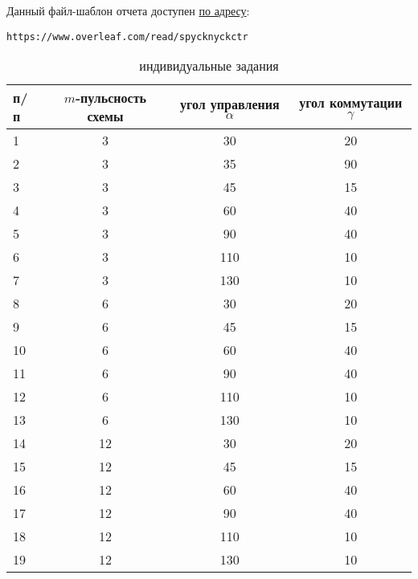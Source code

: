 Данный файл-шаблон отчета доступен \href{https://www.overleaf.com/read/spycknyckctr}{по адресу}:
\begin{verbatim}
https://www.overleaf.com/read/spycknyckctr
\end{verbatim}

\begin{table}[ht!]
\centering
\begin{tabular}{l|c|c|c}
\toprule
	\textnumero п/п&	$m$-пульсность схемы & угол управления $\alpha$ & угол коммутации $\gamma$ \\
\midrule
	1&	3 & 30 & 20\\ 
	2&	3 & 35 & 90\\ 
	3&	3 & 45 & 15\\ 
	4&	3 & 60 & 40\\ 
	5&	3 & 90 & 40\\ 
	6&	3 & 110 & 10\\ 
	7&	3 & 130 & 10\\ 
        8&      6 & 30 & 20\\
        9&      6 & 45 & 15\\
        10&      6 & 60 & 40\\
        11&      6 & 90 & 40\\
        12&      6 & 110 & 10\\
        13&      6 & 130 & 10\\
        14&      12 & 30 & 20\\
        15&      12 & 45 & 15\\
        16&      12 & 60 & 40\\
        17&      12 & 90 & 40\\
        18&      12 & 110 & 10\\
        19&      12 & 130 & 10\\
\bottomrule
\end{tabular}
	\caption{индивидуальные задания}
\end{table}


